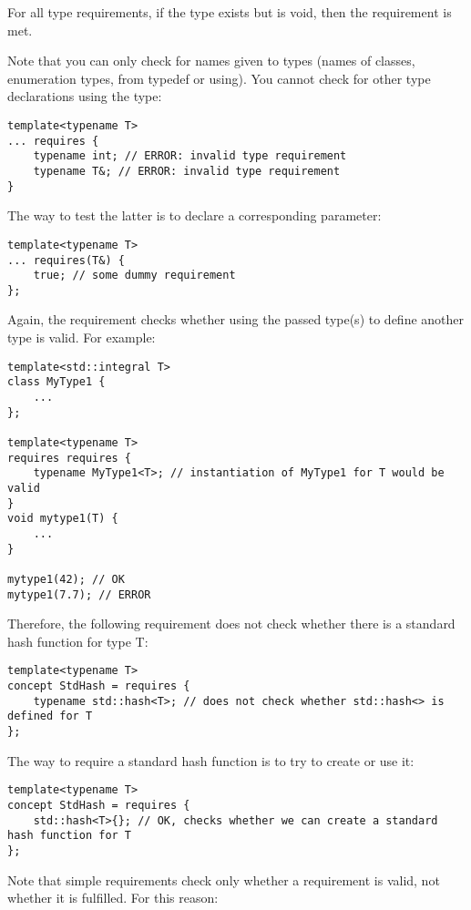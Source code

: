 For all type requirements, if the type exists but is void, then the requirement is met.

Note that you can only check for names given to types (names of classes, enumeration types, from typedef or using). You cannot check for other type declarations using the type:

\begin{lstlisting}[style=styleCXX]
template<typename T>
... requires {
	typename int; // ERROR: invalid type requirement
	typename T&; // ERROR: invalid type requirement
}
\end{lstlisting}

The way to test the latter is to declare a corresponding parameter:

\begin{lstlisting}[style=styleCXX]
template<typename T>
... requires(T&) {
	true; // some dummy requirement
};
\end{lstlisting}

Again, the requirement checks whether using the passed type(s) to define another type is valid. For example:

\begin{lstlisting}[style=styleCXX]
template<std::integral T>
class MyType1 {
	...
};

template<typename T>
requires requires {
	typename MyType1<T>; // instantiation of MyType1 for T would be valid
}
void mytype1(T) {
	...
}

mytype1(42); // OK
mytype1(7.7); // ERROR
\end{lstlisting}

Therefore, the following requirement does not check whether there is a standard hash function for type T:

\begin{lstlisting}[style=styleCXX]
template<typename T>
concept StdHash = requires {
	typename std::hash<T>; // does not check whether std::hash<> is defined for T
};
\end{lstlisting}

The way to require a standard hash function is to try to create or use it:

\begin{lstlisting}[style=styleCXX]
template<typename T>
concept StdHash = requires {
	std::hash<T>{}; // OK, checks whether we can create a standard hash function for T
};
\end{lstlisting}

Note that simple requirements check only whether a requirement is valid, not whether it is fulfilled. For this reason:

